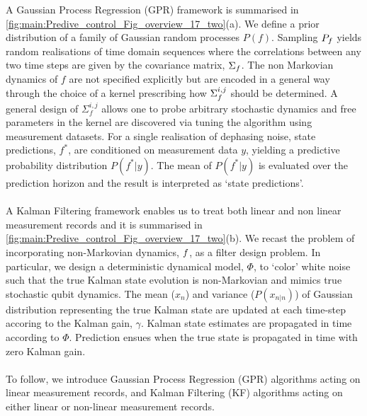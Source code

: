 A Gaussian Process Regression (GPR) framework is summarised in \cref{fig:main:Predive_control_Fig_overview_17_two}(a). We define a prior distribution of a family of Gaussian random processes $P(f)$. Sampling $P_f$ yields random realisations of time domain sequences where the correlations between any two time steps are given by the covariance matrix, $\Sigma_f$. The non Markovian dynamics of $f$ are not specified explicitly but are encoded in a general way through the choice of a kernel prescribing how $\Sigma_f^{i,j}$ should be determined. A general design of $\Sigma_f^{i, j}$ allows one to probe arbitrary stochastic dynamics and free parameters in the kernel are discovered via tuning the algorithm using measurement datasets. For a single realisation of dephasing noise, state predictions, $f^*$, are conditioned on measurement data $y$, yielding a predictive probability distribution $P(f^*|y)$. The mean of $P(f^*|y)$ is evaluated over the prediction horizon and the result is interpreted as `state predictions'. 
\\
\\
A Kalman Filtering framework enables us to treat both linear and non linear measurement records and it is summarised in  \cref{fig:main:Predive_control_Fig_overview_17_two}(b). We recast the problem of incorporating non-Markovian dynamics, $f$, as a filter design problem. In particular, we design a deterministic dynamical model, $\Phi$, to `color' white noise such that the true Kalman state evolution is non-Markovian and  mimics true stochastic qubit dynamics. The mean ($x_n$) and variance ($P(x_{n|n})$) of Gaussian distribution representing the true Kalman state are updated at each time-step accoring to the Kalman gain, $\gamma$. Kalman state estimates are propagated in time according to $\Phi$. Prediction ensues when the true state is propagated in time with zero Kalman gain.  
\\
\\
To follow, we introduce Gaussian Process Regression (GPR) algorithms acting on linear measurement records, and Kalman Filtering (KF) algorithms acting on either linear or non-linear measurement records.

